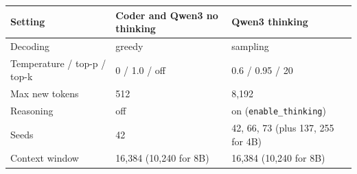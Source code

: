 \begin{tabular}{@{}lll@{}}
\toprule
Setting & Coder and Qwen3 no thinking & Qwen3 thinking \\
\midrule
Decoding & greedy & sampling \\
Temperature / top-p / top-k & 0 / 1.0 / off & 0.6 / 0.95 / 20 \\
Max new tokens & 512 & 8,192 \\
Reasoning & off & on (\texttt{enable\_thinking}) \\
Seeds & 42 & 42, 66, 73 (plus 137, 255 for 4B) \\
Context window & 16,384 (10,240 for 8B) & 16,384 (10,240 for 8B) \\
\bottomrule
\end{tabular}

